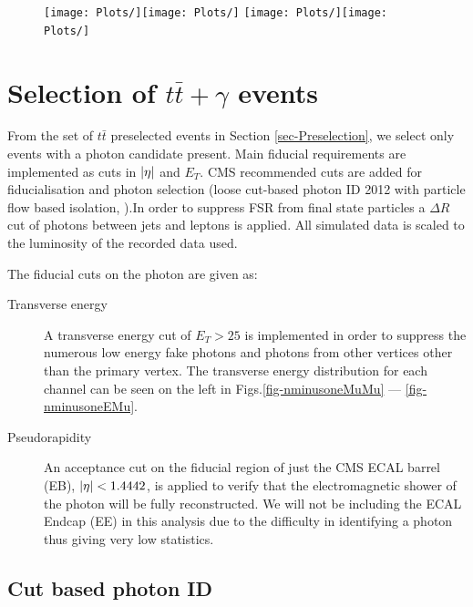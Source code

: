 \begin{figure}
\begin{center}
\texttt{[image: Plots/]}\texttt{[image: Plots/]}
\texttt{[image: Plots/]}\texttt{[image: Plots/]}
\caption{}
\end{center}
\end{figure}

\section{Selection of $t\bar{t}+\gamma$ events} \label{sec-postselection}

From the set of $t\bar{t}$ preselected events in Section \ref{sec-Preselection}, we select only events with a photon candidate present. Main fiducial requirements are implemented as cuts in $\lvert \eta \rvert$ and $E_T$. CMS recommended cuts are added for fiducialisation and photon selection (loose cut-based photon ID 2012 with particle flow based isolation, \cite{CutBasedIsolation2012}).In order to suppress FSR from final state particles a $\Delta R$ cut of photons between jets and leptons is applied. All simulated data is scaled to the luminosity of the recorded data used.  

The fiducial cuts on the photon are given as:

\begin{description}

\item[Transverse energy] A transverse energy cut of $E_T > 25$ is implemented in order to suppress the numerous low energy fake photons and photons from other vertices other than the primary
vertex. The transverse energy distribution for each channel can be seen on the left in Figs.\ref{fig-nminusoneMuMu} --- \ref{fig-nminusoneEMu}.

\item[Pseudorapidity] An acceptance cut on the fiducial region of just the CMS ECAL barrel (EB), $\lvert \eta \rvert < 1.4442$, is applied to verify that the electromagnetic shower of
the photon will be fully reconstructed. We will not be including the ECAL Endcap (EE) in this analysis due to the difficulty in identifying a photon thus giving very low
statistics.

\end{description}

\subsection{Cut based photon ID}

